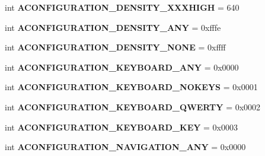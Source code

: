\begin{DoxyCompactItemize}
\item 
\mbox{\label{classconfiguration_1_1AConfiguration_a44694d387e9cdb46539d365497248394}} 
int {\bfseries A\+C\+O\+N\+F\+I\+G\+U\+R\+A\+T\+I\+O\+N\+\_\+\+D\+E\+N\+S\+I\+T\+Y\+\_\+\+X\+X\+X\+H\+I\+GH} = 640
\item 
\mbox{\label{classconfiguration_1_1AConfiguration_abd58210c21719b396a181583c23f53f5}} 
int {\bfseries A\+C\+O\+N\+F\+I\+G\+U\+R\+A\+T\+I\+O\+N\+\_\+\+D\+E\+N\+S\+I\+T\+Y\+\_\+\+A\+NY} = 0xfffe
\item 
\mbox{\label{classconfiguration_1_1AConfiguration_a08561fc7b586f8c3353f71282621da2e}} 
int {\bfseries A\+C\+O\+N\+F\+I\+G\+U\+R\+A\+T\+I\+O\+N\+\_\+\+D\+E\+N\+S\+I\+T\+Y\+\_\+\+N\+O\+NE} = 0xffff
\item 
\mbox{\label{classconfiguration_1_1AConfiguration_a3ecc2578ea92943f65187d6634dbc37d}} 
int {\bfseries A\+C\+O\+N\+F\+I\+G\+U\+R\+A\+T\+I\+O\+N\+\_\+\+K\+E\+Y\+B\+O\+A\+R\+D\+\_\+\+A\+NY} = 0x0000
\item 
\mbox{\label{classconfiguration_1_1AConfiguration_a2b528e8385cba09a67b1841daaf4fee2}} 
int {\bfseries A\+C\+O\+N\+F\+I\+G\+U\+R\+A\+T\+I\+O\+N\+\_\+\+K\+E\+Y\+B\+O\+A\+R\+D\+\_\+\+N\+O\+K\+E\+YS} = 0x0001
\item 
\mbox{\label{classconfiguration_1_1AConfiguration_a4e8ebd1712d6e58c4bb5a861fb0b61e2}} 
int {\bfseries A\+C\+O\+N\+F\+I\+G\+U\+R\+A\+T\+I\+O\+N\+\_\+\+K\+E\+Y\+B\+O\+A\+R\+D\+\_\+\+Q\+W\+E\+R\+TY} = 0x0002
\item 
\mbox{\label{classconfiguration_1_1AConfiguration_a9ca20b01ab367c747e059b1c9db2a912}} 
int {\bfseries A\+C\+O\+N\+F\+I\+G\+U\+R\+A\+T\+I\+O\+N\+\_\+\+K\+E\+Y\+B\+O\+A\+R\+D\+\_\+K\+EY} = 0x0003
\item 
\mbox{\label{classconfiguration_1_1AConfiguration_a0bbcbb629eee480cebde74e6662e6919}} 
int {\bfseries A\+C\+O\+N\+F\+I\+G\+U\+R\+A\+T\+I\+O\+N\+\_\+\+N\+A\+V\+I\+G\+A\+T\+I\+O\+N\+\_\+\+A\+NY} = 0x0000

\end{DoxyCompactItemize}
